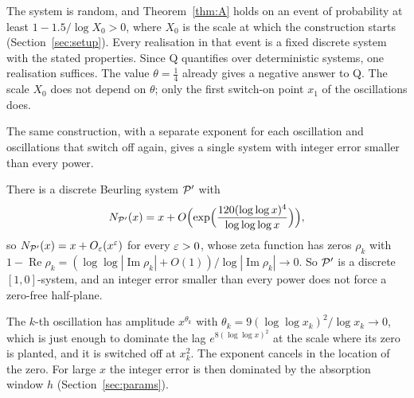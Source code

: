 The system is random, and Theorem~\ref{thm:A} holds on an event of probability at least $1-1.5/\log X_0>0$, where $X_0$ is the
scale at which the construction starts (Section~\ref{sec:setup}). Every realisation in that event is a fixed discrete system
with the stated properties. Since Q quantifies over deterministic systems, one realisation suffices. The value $\theta=\tfrac14$
already gives a negative answer to Q. The scale $X_0$ does not depend on $\theta$; only the first switch-on point $x_1$ of the
oscillations does.

The same construction, with a separate exponent for each oscillation and oscillations that switch off again, gives a single
system with integer error smaller than every power.

\begin{theoremAp}
There is a discrete Beurling system $\mathcal{P}'$ with
\[
  N_{\mathcal{P}'}(x)=x+O\Bigl(\exp\Bigl(\frac{120(\log\log x)^4}{\log\log\log x}\Bigr)\Bigr),
\]
so $N_{\mathcal{P}'}(x)=x+O_\varepsilon(x^\varepsilon)$ for every $\varepsilon>0$, whose zeta function has zeros $\rho_k$ with
$1-\operatorname{Re}\rho_k=(\log\log|\operatorname{Im}\rho_k|+O(1))/\log|\operatorname{Im}\rho_k|\to0$. So $\mathcal{P}'$ is a discrete
$[1,0]$-system, and an integer error smaller than every power does not force a zero-free half-plane.
\end{theoremAp}

The $k$-th oscillation has amplitude $x^{\theta_k}$ with $\theta_k=9(\log\log x_k)^2/\log x_k\to0$, which is just enough to dominate
the lag $e^{8(\log\log x)^2}$ at the scale where its zero is planted, and it is switched off at $x_k^2$. The exponent cancels in
the location of the zero. For large $x$ the integer error is then dominated by the absorption window $h$ (Section~\ref{sec:params}).

